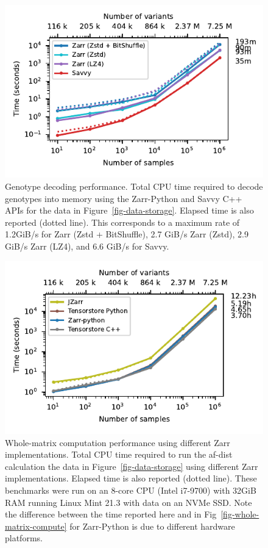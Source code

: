 \documentclass[a4paper,num-refs]{oup-contemporary}
\begin{document}
\begin{figure}[h]
\includegraphics{figures/whole-matrix-decode}
\caption{Genotype decoding performance.
Total CPU time required to decode genotypes into memory using the Zarr-Python
and Savvy C++ APIs for the data in Figure~\ref{fig-data-storage}.
Elapsed time is also reported (dotted line). 
This corresponds to a maximum rate of 1.2GiB/s for Zarr (Zstd + BitShuffle),
2.7 GiB/s Zarr (Zstd), 2.9 GiB/s Zarr (LZ4), and 6.6 GiB/s for Savvy. 
\label{fig-whole-matrix-decode}}
\end{figure}

\begin{figure}[h]
\includegraphics{figures/whole-matrix-compute-zarr-versions}
\caption{Whole-matrix computation performance using different Zarr 
implementations. 
Total CPU time required to run the af-dist calculation
the data in Figure~\ref{fig-data-storage} using different Zarr implementations.
Elapsed time is also reported (dotted line). 
These benchmarks were run on an 8-core CPU (Intel i7-9700) with 32GiB RAM running
Linux Mint 21.3 with data on an NVMe SSD.
Note the difference between the
time reported here and in Fig~\ref{fig-whole-matrix-compute} for Zarr-Python
is due to different hardware platforms.
\label{fig-whole-matrix-compute-zarr-versions}}
\end{figure}
\end{document}
